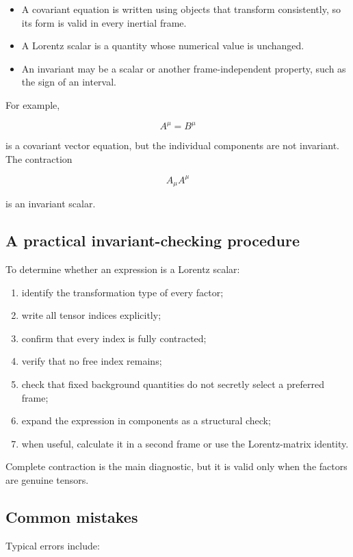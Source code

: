 \begin{itemize}
    \item A covariant equation is written using objects that transform consistently, so its form is valid in every inertial frame.
    \item A Lorentz scalar is a quantity whose numerical value is unchanged.
    \item An invariant may be a scalar or another frame-independent property, such as the sign of an interval.
\end{itemize}

For example,

\[
A^{\mu}=B^{\mu}
\]

is a covariant vector equation, but the individual components are not invariant. The contraction

\[
A_{\mu}A^{\mu}
\]

is an invariant scalar.

\subsection{A practical invariant-checking procedure}

To determine whether an expression is a Lorentz scalar:

\begin{enumerate}
    \item identify the transformation type of every factor;
    \item write all tensor indices explicitly;
    \item confirm that every index is fully contracted;
    \item verify that no free index remains;
    \item check that fixed background quantities do not secretly select a preferred frame;
    \item expand the expression in components as a structural check;
    \item when useful, calculate it in a second frame or use the Lorentz-matrix identity.
\end{enumerate}

Complete contraction is the main diagnostic, but it is valid only when the factors are genuine tensors.

\subsection{Common mistakes}

Typical errors include:

